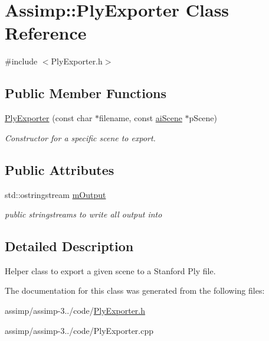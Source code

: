 \hypertarget{class_assimp_1_1_ply_exporter}{\section{Assimp\+:\+:Ply\+Exporter Class Reference}
\label{class_assimp_1_1_ply_exporter}
}


{\ttfamily \#include $<$Ply\+Exporter.\+h$>$}

\subsection*{Public Member Functions}
\begin{DoxyCompactItemize}
\item 
\hypertarget{class_assimp_1_1_ply_exporter_a1dcaa5f724d9dabd68cabd050e6159d4}{\hyperlink{class_assimp_1_1_ply_exporter_a1dcaa5f724d9dabd68cabd050e6159d4}{Ply\+Exporter} (const char $\ast$filename, const \hyperlink{structai_scene}{ai\+Scene} $\ast$p\+Scene)}\label{class_assimp_1_1_ply_exporter_a1dcaa5f724d9dabd68cabd050e6159d4}

\begin{DoxyCompactList}\small\item\em Constructor for a specific scene to export. \end{DoxyCompactList}\end{DoxyCompactItemize}
\subsection*{Public Attributes}
\begin{DoxyCompactItemize}
\item 
\hypertarget{class_assimp_1_1_ply_exporter_a8d753f9d68a418c4695ad59ff01b6585}{std\+::ostringstream \hyperlink{class_assimp_1_1_ply_exporter_a8d753f9d68a418c4695ad59ff01b6585}{m\+Output}}\label{class_assimp_1_1_ply_exporter_a8d753f9d68a418c4695ad59ff01b6585}

\begin{DoxyCompactList}\small\item\em public stringstreams to write all output into \end{DoxyCompactList}\end{DoxyCompactItemize}


\subsection{Detailed Description}
Helper class to export a given scene to a Stanford Ply file. 

The documentation for this class was generated from the following files\+:\begin{DoxyCompactItemize}
\item 
assimp/assimp-\/3../code/\hyperlink{_ply_exporter_8h}{Ply\+Exporter.\+h}\item 
assimp/assimp-\/3../code/Ply\+Exporter.\+cpp\end{DoxyCompactItemize}
